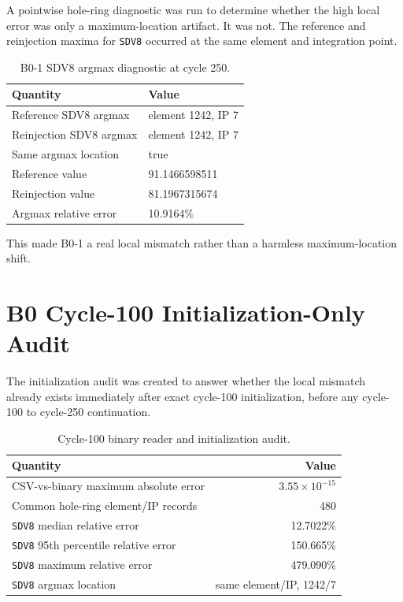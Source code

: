 \documentclass[11pt,a4paper]{article}
\newcommand{\code}[1]{\texttt{#1}}
\begin{document}
A pointwise hole-ring diagnostic was run to determine whether the high local error was only a maximum-location artifact. It was not. The reference and reinjection maxima for \code{SDV8} occurred at the same element and integration point.

\begin{table}[H]
\centering
\caption{B0-1 SDV8 argmax diagnostic at cycle 250.}
\begin{tabular}{ll}
\toprule
Quantity & Value \\
\midrule
Reference SDV8 argmax & element 1242, IP 7 \\
Reinjection SDV8 argmax & element 1242, IP 7 \\
Same argmax location & true \\
Reference value & 91.1466598511 \\
Reinjection value & 81.1967315674 \\
Argmax relative error & 10.9164\% \\
\bottomrule
\end{tabular}
\end{table}

This made B0-1 a real local mismatch rather than a harmless maximum-location shift.

\section{B0 Cycle-100 Initialization-Only Audit}

The initialization audit was created to answer whether the local mismatch already exists immediately after exact cycle-100 initialization, before any cycle-100 to cycle-250 continuation.

\begin{table}[H]
\centering
\caption{Cycle-100 binary reader and initialization audit.}
\begin{tabular}{lr}
\toprule
Quantity & Value \\
\midrule
CSV-vs-binary maximum absolute error & $3.55 \times 10^{-15}$ \\
Common hole-ring element/IP records & 480 \\
\code{SDV8} median relative error & 12.7022\% \\
\code{SDV8} 95th percentile relative error & 150.665\% \\
\code{SDV8} maximum relative error & 479.090\% \\
\code{SDV8} argmax location & same element/IP, 1242/7 \\
\bottomrule
\end{tabular}
\end{table}
\end{document}
